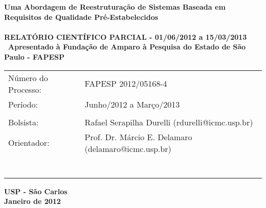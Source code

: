 \documentclass[a4paper,12pt]{article}
\begin{document}
\begin{center}
\vspace*{1cm}
{\fontsize{17.28}{20}\sffamily\bfseries\selectfont Uma Abordagem de Reestruturação de Sistemas Baseada em Requisitos de Qualidade Pré-Estabelecidos \\\ \\

\small{RELATÓRIO CIENTÍFICO PARCIAL - 01/06/2012 a 15/03/2013}\\ \
\textsf{Apresentado à Fundação de Amparo à Pesquisa do Estado de São Paulo - FAPESP}
 \\
\vspace{3cm}}


\begin{table}[!th]
  \begin{center}
    \begin{tabular}{ll}

	  Número do Processo:      &   FAPESP 2012/05168-4     \\
      Período:        &  Junho/2012 a Março/2013                    \\
	                   &                                \\
      Bolsista:           &  Rafael Serapilha Durelli (rdurelli@icmc.usp.br)                                     \\
	  
	  \vspace{0.6cm}
      Orientador:        &  Prof. Dr. Márcio E. Delamaro (delamaro@icmc.usp.br)                                           \\

	         &                              \\
	          &  \\
                       &                                  \\
       &                                       \\
              &                                             \\ \\
      \vspace{1cm}

    \end{tabular}
  \end{center}
\end{table}

\vfill
{\fontsize{18}{20}\sffamily\bfseries\selectfont USP - São Carlos \\ Janeiro de 2012}

\end{center}
\end{document}
